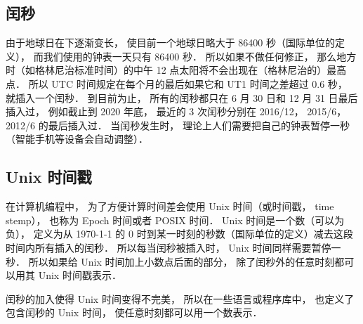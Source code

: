 \subsection{闰秒}
由于地球日在下逐渐变长， 使目前一个地球日略大于 86400 秒（国际单位的定义）， 而我们使用的钟表一天只有 86400 秒． 所以如果不做任何修正， 那么地方时（如格林尼治标准时间）的中午 12 点太阳将不会出现在（格林尼治的）最高点． 所以 UTC 时间规定在每个月的最后如果它和 UT1 时间之差超过 0.6 秒， 就插入一个闰秒． 到目前为止， 所有的闰秒都只在 6 月 30 日和 12 月 31 日最后插入过， 例如截止到 2020 年底， 最近的 3 次闰秒分别在 2016/12， 2015/6， 2012/6 的最后插入过． 当闰秒发生时， 理论上人们需要把自己的钟表暂停一秒（智能手机等设备会自动调整）．

\subsection{Unix 时间戳}
在计算机编程中， 为了方便计算时间差会使用 Unix 时间（或时间戳， time stemp）， 也称为 Epoch 时间或者 POSIX 时间． Unix 时间是一个数（可以为负）， 定义为从 1970-1-1 的 0 时到某一时刻的秒数（国际单位的定义）减去这段时间内所有插入的闰秒． 所以每当闰秒被插入时， Unix 时间同样需要暂停一秒． 所以如果给 Unix 时间加上小数点后面的部分， 除了闰秒外的任意时刻都可以用其 Unix 时间戳表示．

闰秒的加入使得 Unix 时间变得不完美， 所以在一些语言或程序库中， 也定义了包含闰秒的 Unix 时间， 使任意时刻都可以用一个数表示．
